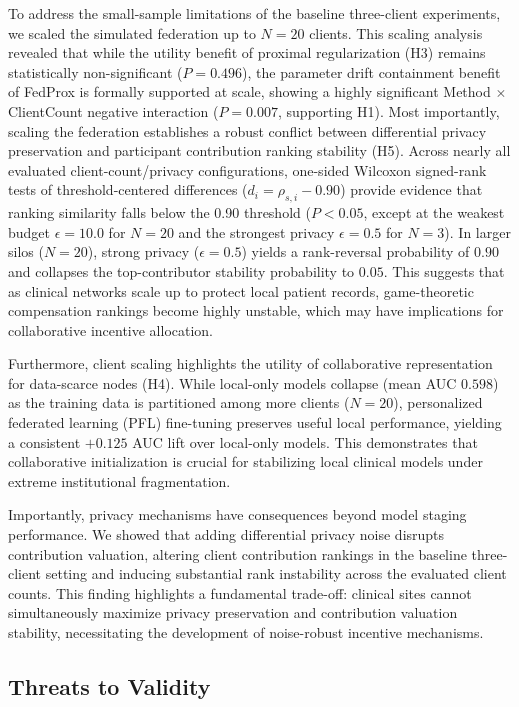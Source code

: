 \documentclass[conference]{IEEEtran}
\begin{document}
To address the small-sample limitations of the baseline three-client experiments, we scaled the simulated federation up to $N=20$ clients. This scaling analysis revealed that while the utility benefit of proximal regularization (H3) remains statistically non-significant ($P=0.496$), the parameter drift containment benefit of FedProx is formally supported at scale, showing a highly significant Method $\times$ ClientCount negative interaction ($P=0.007$, supporting H1). Most importantly, scaling the federation establishes a robust conflict between differential privacy preservation and participant contribution ranking stability (H5). Across nearly all evaluated client-count/privacy configurations, one-sided Wilcoxon signed-rank tests of threshold-centered differences ($d_i = \rho_{s,i} - 0.90$) provide evidence that ranking similarity falls below the 0.90 threshold ($P < 0.05$, except at the weakest budget $\epsilon=10.0$ for $N=20$ and the strongest privacy $\epsilon=0.5$ for $N=3$). In larger silos ($N=20$), strong privacy ($\epsilon=0.5$) yields a rank-reversal probability of $0.90$ and collapses the top-contributor stability probability to $0.05$. This suggests that as clinical networks scale up to protect local patient records, game-theoretic compensation rankings become highly unstable, which may have implications for collaborative incentive allocation.

Furthermore, client scaling highlights the utility of collaborative representation for data-scarce nodes (H4). While local-only models collapse (mean AUC $0.598$) as the training data is partitioned among more clients ($N=20$), personalized federated learning (PFL) fine-tuning preserves useful local performance, yielding a consistent $+0.125$ AUC lift over local-only models. This demonstrates that collaborative initialization is crucial for stabilizing local clinical models under extreme institutional fragmentation.

Importantly, privacy mechanisms have consequences beyond model staging performance. We showed that adding differential privacy noise disrupts contribution valuation, altering client contribution rankings in the baseline three-client setting and inducing substantial rank instability across the evaluated client counts. This finding highlights a fundamental trade-off: clinical sites cannot simultaneously maximize privacy preservation and contribution valuation stability, necessitating the development of noise-robust incentive mechanisms. 

\subsection{Threats to Validity}
\label{sec:threats_validity}
\end{document}
